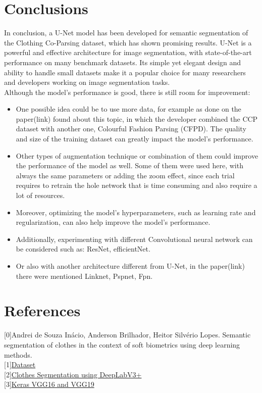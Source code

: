 \documentclass{article}
\begin{document}
\section{Conclusions}\label{sec:conclusions}
In conclusion, a U-Net model has been developed for semantic segmentation of the Clothing Co-Parsing dataset, which has shown promising results. 
U-Net is a powerful and effective architecture for image segmentation, with state-of-the-art performance on many benchmark datasets. Its simple yet elegant design and ability to handle small datasets make it a popular choice for many researchers and developers working on image segmentation tasks.\\
Although the model's performance is good, there is still room for improvement: 
\begin{itemize}
    \item One possible idea could be to use more data, for example as done on the paper(link) found about this topic, in which the developer combined the CCP dataset with another one, Colourful Fashion Parsing (CFPD). The quality and size of the training dataset can greatly impact the model's performance.
    \item Other types of augmentation technique or combination of them could improve the performance of the model as well. Some of them were used here, with always the same parameters or adding the zoom effect, since each trial requires to retrain the hole network that is time consuming and also require a lot of resources.
    \item Moreover, optimizing the model's hyperparameters, such as learning rate and regularization, can also help improve the model's performance. 
    \item Additionally, experimenting with different Convolutional neural network can be considered such as: ResNet, efficientNet.
    \item Or also with another architecture different from U-Net, in the paper(link) there were mentioned Linknet, Pspnet, Fpn.
\end{itemize}

\newpage
\section*{References}
{[0]}Andrei de Souza Inácio, Anderson Brilhador, Heitor Silvério Lopes. Semantic segmentation of clothes in the context of soft biometrics using deep learning methods.\\
{[1]}\href{https://github.com/bearpaw/clothing-co-parsing}{Dataset}\\
{[2]}\href{https://github.com/mberkay0/clothing-segmentation}{Clothes Segmentation using DeepLabV3+}\\
{[3]}\href{https://keras.io/api/applications/vgg/}{Keras VGG16 and VGG19}
\end{document}
